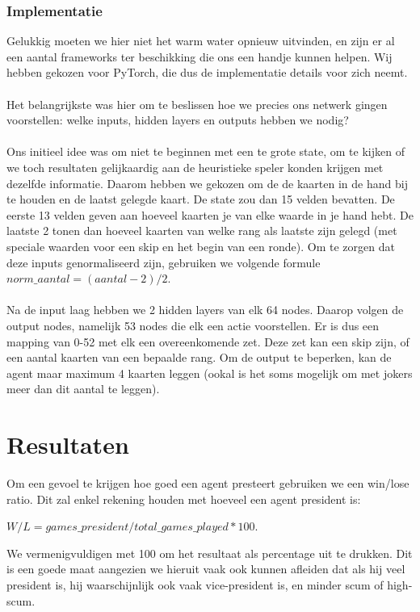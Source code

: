 \documentclass[11pt]{article}
\begin{document}
\subsubsection{Implementatie}
Gelukkig moeten we hier niet het warm water opnieuw uitvinden, en zijn er al een aantal frameworks ter beschikking die ons een handje kunnen helpen. Wij hebben gekozen voor PyTorch, die dus de implementatie details voor zich neemt.\\\\
Het belangrijkste was hier om te beslissen hoe we precies ons netwerk gingen voorstellen: welke inputs, hidden layers en outputs hebben we nodig?\\\\
Ons initieel idee was om niet te beginnen met een te grote state, om te kijken of we toch resultaten gelijkaardig aan de heuristieke speler konden krijgen met dezelfde informatie. Daarom hebben we gekozen om de de kaarten in de hand bij te houden en de laatst gelegde kaart. De state zou dan 15 velden bevatten. De eerste 13 velden geven aan hoeveel kaarten je van elke waarde in je hand hebt. De laatste 2 tonen dan hoeveel kaarten van welke rang als laatste zijn gelegd (met speciale waarden voor een skip en het begin van een ronde). Om te zorgen dat deze inputs genormaliseerd zijn, gebruiken we volgende formule $norm\_aantal = (aantal - 2)/2$.\\\\
Na de input laag hebben we 2 hidden layers van elk 64 nodes. Daarop volgen de output nodes, namelijk 53 nodes die elk een actie voorstellen. Er is dus een mapping van 0-52 met elk een overeenkomende zet. Deze zet kan een skip zijn, of een aantal kaarten van een bepaalde rang. Om de output te beperken, kan de agent maar maximum 4 kaarten leggen (ookal is het soms mogelijk om met jokers meer dan dit aantal te leggen).\\

\section{Resultaten}
Om een gevoel te krijgen hoe goed een agent presteert gebruiken we een win/lose ratio. Dit zal enkel rekening houden met hoeveel een agent president is:
\begin{center}
$W/L = games\_president/total\_games\_played * 100$.
\end{center}
We vermenigvuldigen met 100 om het resultaat als percentage uit te drukken. Dit is een goede maat aangezien we hieruit vaak ook kunnen afleiden dat als hij veel president is, hij waarschijnlijk ook vaak vice-president is, en minder scum of high-scum.
\end{document}
